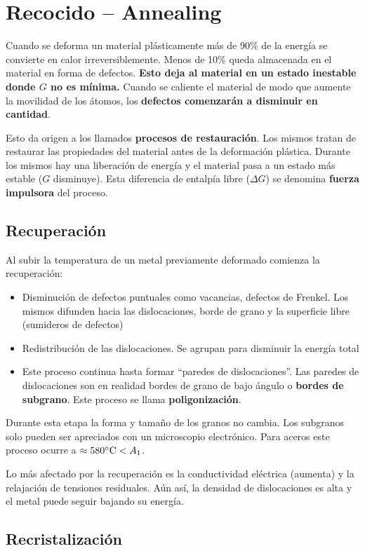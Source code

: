 \section{Recocido -- Annealing}

Cuando se deforma un material plásticamente más de 90\% de la energía se convierte en calor irreversiblemente. Menos de 10\% queda almacenada en el material en forma de defectos. \textbf{Esto deja al material en un estado inestable donde $G$ no es mínima.} Cuando se caliente el material de modo que aumente la movilidad de los átomos, los {\bf defectos comenzarán a disminuir en cantidad}.


Esto da origen a los llamados \textbf{procesos de restauración}. Los mismos tratan de restaurar las propiedades del material antes de la deformación plástica. Durante los mismos hay una liberación de energía y el material pasa a un estado más estable ($G$ disminuye). Esta diferencia de entalpía libre ($\Delta G$) se denomina \textbf{fuerza impulsora} del proceso.

\subsection{Recuperación}
Al subir la temperatura de un metal previamente deformado comienza la recuperación:
\begin{itemize}
	\item Disminución de defectos puntuales como vacancias, defectos de Frenkel. Los mismos difunden hacia las dislocaciones, borde de grano y la superficie libre (sumideros de defectos)
	\item Redistribución de las dislocaciones. Se agrupan para disminuir la energía total
	\item Este proceso continua hasta formar ``paredes de dislocaciones''. Las paredes de dislocaciones son en realidad bordes de grano de bajo ángulo o \textbf{bordes de subgrano}. Este proceso se llama \textbf{poligonización}.
\end{itemize}

Durante esta etapa la forma y tamaño de los granos no cambia. Los subgranos solo pueden ser apreciados con un microscopio electrónico. Para aceros este proceso ocurre a $\approx 580 ^\circ \mathrm{C} < A_1$.

Lo más afectado por la recuperación es la conductividad eléctrica (aumenta) y la relajación de tensiones residuales. Aún así, la densidad de dislocaciones es alta y el metal puede seguir bajando su energía.


\subsection{Recristalización}

